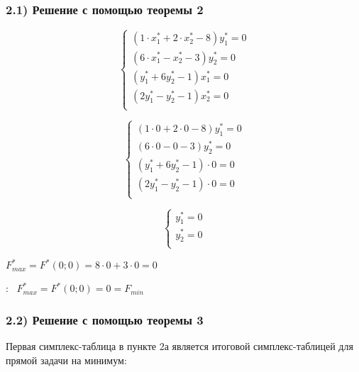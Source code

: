 \subsubsection{2.1) Решение с помощью теоремы 2}

\begin{equation*}
    \begin{cases}
        (1 \cdot x_1^{*} + 2 \cdot x_2^{*} - 8)y_1^{*} = 0\\
        (6 \cdot x_1^{*} - x_2^{*} - 3)y_2^{*} = 0\\
        (y_1^{*} + 6y_2^{*} - 1)x_1^{*} = 0\\
        (2y_1^{*} - y_2^{*} - 1)x_2^{*} = 0\\
    \end{cases}
\end{equation*}

\begin{equation*}
    \begin{cases}
        (1 \cdot 0 + 2 \cdot 0 - 8)y_1^{*} = 0\\
        (6 \cdot 0 - 0 - 3)y_2^{*} = 0\\
        (y_1^{*} + 6y_2^{*} - 1) \cdot 0 = 0\\
        (2y_1^{*} - y_2^{*} - 1) \cdot 0 = 0\\
    \end{cases}
\end{equation*}

\begin{equation*}
    \begin{cases}
        y_1^{*} = 0\\
        y_2^{*} = 0\\
    \end{cases}
\end{equation*}

\begin{flushleft}
$F_{max}^{*} = F^{*}(0; 0) = 8 \cdot 0 + 3 \cdot 0 = 0$
\end{flushleft}

{:~} $F_{max}^{*} = F^{*}(0; 0) = 0 = F_{min}$

\subsubsection{2.2) Решение с помощью теоремы 3}

\begin{flushleft}
Первая симплекс-таблица в пункте 2а является итоговой симплекс-таблицей для прямой задачи на минимум:
\end{flushleft}

